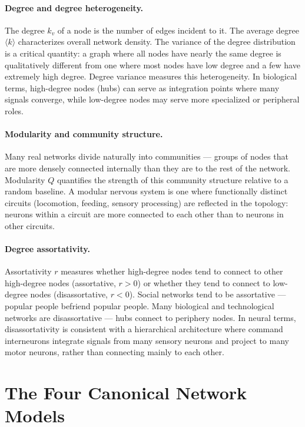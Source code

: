 \documentclass[12pt,a4paper]{report}
\begin{document}
\paragraph{Degree and degree heterogeneity.} The degree $k_v$ of a node is the number of edges incident to it. The average degree $\langle k \rangle$ characterizes overall network density. The variance of the degree distribution is a critical quantity: a graph where all nodes have nearly the same degree is qualitatively different from one where most nodes have low degree and a few have extremely high degree. Degree variance measures this heterogeneity. In biological terms, high-degree nodes (hubs) can serve as integration points where many signals converge, while low-degree nodes may serve more specialized or peripheral roles.

\paragraph{Modularity and community structure.} Many real networks divide naturally into communities — groups of nodes that are more densely connected internally than they are to the rest of the network. Modularity $Q$ quantifies the strength of this community structure relative to a random baseline. A modular nervous system is one where functionally distinct circuits (locomotion, feeding, sensory processing) are reflected in the topology: neurons within a circuit are more connected to each other than to neurons in other circuits.

\paragraph{Degree assortativity.} Assortativity $r$ measures whether high-degree nodes tend to connect to other high-degree nodes (assortative, $r > 0$) or whether they tend to connect to low-degree nodes (disassortative, $r < 0$). Social networks tend to be assortative — popular people befriend popular people. Many biological and technological networks are disassortative — hubs connect to periphery nodes. In neural terms, disassortativity is consistent with a hierarchical architecture where command interneurons integrate signals from many sensory neurons and project to many motor neurons, rather than connecting mainly to each other.

\section{The Four Canonical Network Models}
\end{document}
